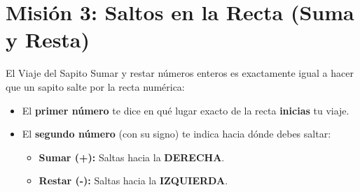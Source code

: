 \documentclass[12pt, letterpaper]{article}
\begin{document}
	\section*{Misión 3: Saltos en la Recta (Suma y Resta)}
	
	\begin{truco}{El Viaje del Sapito}
		Sumar y restar números enteros es exactamente igual a hacer que un sapito salte por la recta numérica:
		\begin{itemize}
			\item El \textbf{primer número} te dice en qué lugar exacto de la recta \textbf{inicias} tu viaje.
			\item El \textbf{segundo número} (con su signo) te indica hacia dónde debes saltar:
			\begin{itemize}
				\item \textbf{Sumar (+):} Saltas hacia la \textcolor{valblue}{\textbf{DERECHA}}.
				\item \textbf{Restar (-):} Saltas hacia la \textcolor{valred}{\textbf{IZQUIERDA}}.
			\end{itemize}
		\end{itemize}
	\end{truco}
	
\end{document}
